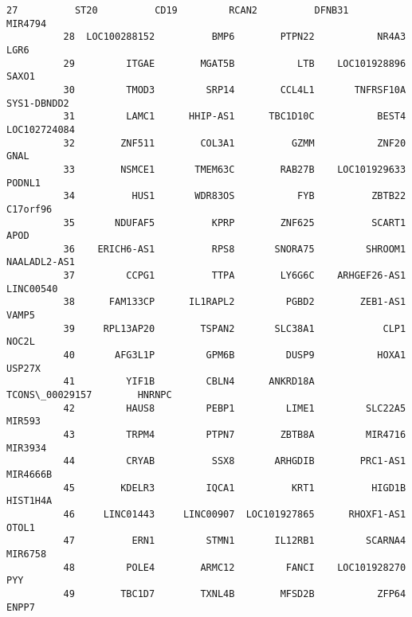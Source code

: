 \documentclass[11pt]{article}
\begin{document}
\begin{Verbatim}[commandchars=\\\{\}]
          27          ST20          CD19         RCAN2          DFNB31       MIR4794   
          28  LOC100288152          BMP6        PTPN22           NR4A3          LGR6   
          29         ITGAE        MGAT5B           LTB    LOC101928896         SAXO1   
          30         TMOD3         SRP14        CCL4L1       TNFRSF10A   SYS1-DBNDD2   
          31         LAMC1      HHIP-AS1      TBC1D10C           BEST4  LOC102724084   
          32        ZNF511        COL3A1          GZMM           ZNF20          GNAL   
          33        NSMCE1       TMEM63C        RAB27B    LOC101929633        PODNL1   
          34          HUS1       WDR83OS           FYB          ZBTB22      C17orf96   
          35       NDUFAF5          KPRP        ZNF625          SCART1          APOD   
          36    ERICH6-AS1          RPS8       SNORA75         SHROOM1  NAALADL2-AS1   
          37         CCPG1          TTPA        LY6G6C    ARHGEF26-AS1     LINC00540   
          38      FAM133CP      IL1RAPL2         PGBD2        ZEB1-AS1         VAMP5   
          39     RPL13AP20        TSPAN2       SLC38A1            CLP1         NOC2L   
          40       AFG3L1P         GPM6B         DUSP9           HOXA1        USP27X   
          41         YIF1B         CBLN4      ANKRD18A  TCONS\_00029157        HNRNPC   
          42         HAUS8         PEBP1         LIME1         SLC22A5        MIR593   
          43         TRPM4         PTPN7        ZBTB8A         MIR4716       MIR3934   
          44         CRYAB          SSX8       ARHGDIB        PRC1-AS1      MIR4666B   
          45        KDELR3         IQCA1          KRT1          HIGD1B      HIST1H4A   
          46     LINC01443     LINC00907  LOC101927865      RHOXF1-AS1         OTOL1   
          47          ERN1         STMN1       IL12RB1         SCARNA4       MIR6758   
          48         POLE4        ARMC12         FANCI    LOC101928270           PYY   
          49        TBC1D7        TXNL4B        MFSD2B           ZFP64         ENPP7   
          

\end{Verbatim}
\end{document}
